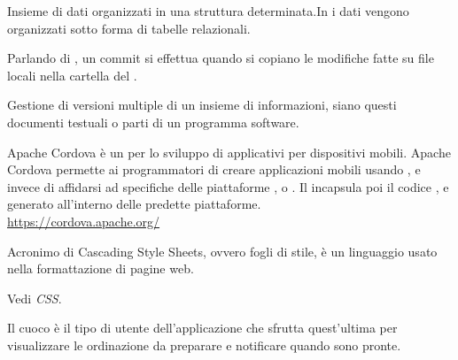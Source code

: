 Insieme di dati organizzati in una struttura determinata.In  i dati vengono organizzati sotto forma di tabelle relazionali.

Parlando di , un commit si effettua quando si copiano le modifiche fatte su file locali nella cartella del .

Gestione di versioni multiple di un insieme di informazioni, siano questi documenti testuali o parti di un programma software.

Apache Cordova è un  per lo sviluppo di applicativi per dispositivi mobili. Apache Cordova permette ai programmatori di creare applicazioni mobili usando ,  e  invece di affidarsi ad  specifiche delle piattaforme ,  o . Il  incapsula poi il codice ,  e  generato all'interno delle predette piattaforme.\\
\url{https://cordova.apache.org/}

Acronimo di Cascading Style Sheets, ovvero fogli di stile, \`e un linguaggio usato nella formattazione di pagine web.

Vedi \textit{CSS}.

Il cuoco è il tipo di utente dell’applicazione che sfrutta quest’ultima per visualizzare le ordinazione da preparare e notificare quando sono pronte.
\clearpage